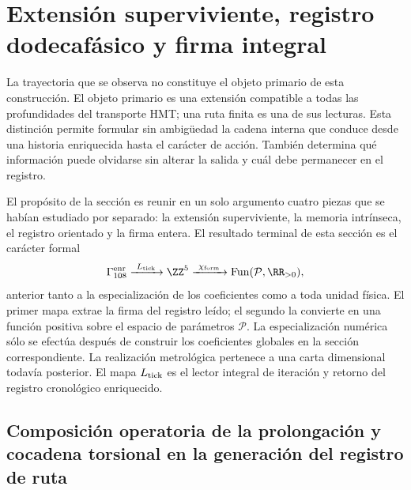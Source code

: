 \chapter{Extensión superviviente, registro dodecafásico y firma integral}
\label{chap:extension-ruta-caracter}

La trayectoria que se observa no constituye el objeto primario de esta
construcción. El objeto primario es una extensión compatible a todas las
profundidades del transporte HMT; una ruta finita es una de sus lecturas. Esta
distinción permite formular sin ambigüedad la cadena interna que conduce desde
una historia enriquecida hasta el carácter de acción. También determina qué
información puede olvidarse sin alterar la salida y cuál debe permanecer en el
registro.

El propósito de la sección es reunir en un solo argumento cuatro piezas que se
habían estudiado por separado: la extensión superviviente, la memoria
intrínseca, el registro orientado y la firma entera. El resultado terminal de
esta sección es el carácter formal
\[
 \Gamma_{108}^{\rm enr}
 \xrightarrow{\ L_{\rm tick}\ }
 \ZZ^5
 \xrightarrow{\ \chi_{\rm form}\ }
 \operatorname{Fun}(\mathcal P,\RR_{>0}),
\]
anterior tanto a la especialización de los coeficientes como a toda unidad
física. El primer mapa extrae la firma del registro leído; el segundo la
convierte en una función positiva sobre el espacio de parámetros
\(\mathcal P\). La especialización numérica sólo se efectúa después de
construir los coeficientes globales en la sección correspondiente. La
realización metrológica pertenece a una carta dimensional todavía posterior.
El mapa \(L_{\rm tick}\) es el lector integral de iteración y retorno del
registro cronológico enriquecido.

\section{Composición operatoria de la prolongación y cocadena torsional en la generación del registro de ruta}

